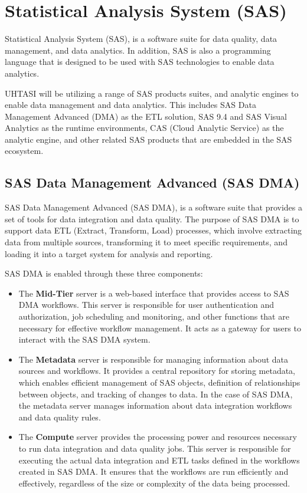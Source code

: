 \section{Statistical Analysis System (SAS)} \label{section: SAS}
Statistical Analysis System (SAS), is a software suite for data quality, data management, and data analytics. In addition, SAS is also a programming language that is designed to be used with SAS technologies to enable data analytics.

UHTASI will be utilizing a range of SAS products suites, and analytic engines to enable data management and data analytics. This includes SAS Data Management Advanced (DMA) as the ETL solution, SAS 9.4 and SAS Visual Analytics as the runtime environments, CAS (Cloud Analytic Service) as the analytic engine, and other related SAS products that are embedded in the SAS ecosystem.

\subsection{SAS Data Management Advanced (SAS DMA)}
SAS Data Management Advanced (SAS DMA), is a software suite that provides a set of tools for data integration and data quality. The purpose of SAS DMA is to support data ETL (Extract, Transform, Load) processes, which involve extracting data from multiple sources, transforming it to meet specific requirements, and loading it into a target system for analysis and reporting. 

SAS DMA is enabled through these three components:

\begin{itemize}
    \item The \textbf{Mid-Tier} server is a web-based interface that provides access to SAS DMA workflows. This server is responsible for user authentication and authorization, job scheduling and monitoring, and other functions that are necessary for effective workflow management. It acts as a gateway for users to interact with the SAS DMA system.
    \item The \textbf{Metadata} server is responsible for managing information about data sources and workflows. It provides a central repository for storing metadata, which enables efficient management of SAS objects, definition of relationships between objects, and tracking of changes to data. In the case of SAS DMA, the metadata server manages information about data integration workflows and data quality rules.
    \item The \textbf{Compute} server provides the processing power and resources necessary to run data integration and data quality jobs. This server is responsible for executing the actual data integration and ETL tasks defined in the workflows created in SAS DMA. It ensures that the workflows are run efficiently and effectively, regardless of the size or complexity of the data being processed.
\end{itemize}

